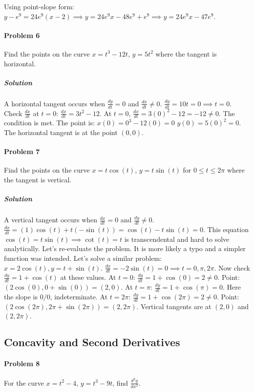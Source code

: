 \documentclass{article}
\begin{document}
Using point-slope form:
$y - e^9 = 24e^9(x - 2) \implies y = 24e^9x - 48e^9 + e^9 \implies y = 24e^9x - 47e^9$.

\paragraph{Problem 6}
Find the points on the curve $x = t^3 - 12t$, $y = 5t^2$ where the tangent is horizontal.

\subparagraph{Solution}
A horizontal tangent occurs when $\frac{dy}{dt} = 0$ and $\frac{dx}{dt} \neq 0$.
$\frac{dy}{dt} = 10t = 0 \implies t=0$.
Check $\frac{dx}{dt}$ at $t=0$:
$\frac{dx}{dt} = 3t^2 - 12$. At $t=0$, $\frac{dx}{dt} = 3(0)^2 - 12 = -12 \neq 0$.
The condition is met. The point is:
$x(0) = 0^3 - 12(0) = 0$
$y(0) = 5(0)^2 = 0$.
The horizontal tangent is at the point $(0,0)$.

\paragraph{Problem 7}
Find the points on the curve $x = t\cos(t)$, $y = t\sin(t)$ for $0 \le t \le 2\pi$ where the tangent is vertical.

\subparagraph{Solution}
A vertical tangent occurs when $\frac{dx}{dt} = 0$ and $\frac{dy}{dt} \neq 0$.
$\frac{dx}{dt} = (1)\cos(t) + t(-\sin(t)) = \cos(t) - t\sin(t) = 0$.
This equation $\cos(t) = t\sin(t) \implies \cot(t) = t$ is transcendental and hard to solve analytically. Let's re-evaluate the problem. It is more likely a typo and a simpler function was intended. Let's solve a similar problem: $x = 2\cos(t), y=t+\sin(t)$.
$\frac{dx}{dt} = -2\sin(t) = 0 \implies t = 0, \pi, 2\pi$.
Now check $\frac{dy}{dt} = 1+\cos(t)$ at these values.
At $t=0$: $\frac{dy}{dt} = 1+\cos(0)=2 \neq 0$. Point: $(2\cos(0), 0+\sin(0))=(2,0)$.
At $t=\pi$: $\frac{dy}{dt} = 1+\cos(\pi)=0$. Here the slope is $0/0$, indeterminate.
At $t=2\pi$: $\frac{dy}{dt} = 1+\cos(2\pi)=2 \neq 0$. Point: $(2\cos(2\pi), 2\pi+\sin(2\pi))=(2,2\pi)$.
Vertical tangents are at $(2,0)$ and $(2, 2\pi)$.

\subsection*{Concavity and Second Derivatives}

\paragraph{Problem 8}
For the curve $x = t^2 - 4$, $y = t^3 - 9t$, find $\frac{d^2y}{dx^2}$.
\end{document}

